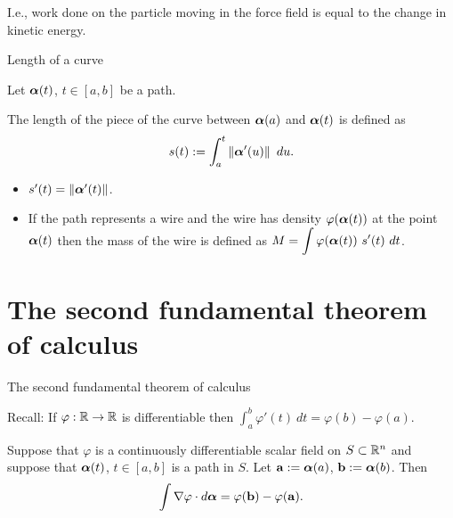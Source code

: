 {I.e.,}
work done on the particle moving in the force field is equal to the change in kinetic energy.





    {Length of a curve}

Let \(\boldsymbol{\alpha}(t)\), \(t\in [a,b]\) be a path.
\begin{definition}
    The length of the piece of the curve between \(\boldsymbol{\alpha}(a)\) and \(\boldsymbol{\alpha}(t)\) is defined as
    \[
        s(t) := \int_a^t \norm{\aalpha'(u)} \ du.
    \]
\end{definition}

\begin{itemize}
    \item  \(s'(t) = \left\|\boldsymbol{\alpha}'(t)\right\| \).
    \item If the path represents a wire and the wire has density \(\varphi(\boldsymbol{\alpha}(t))\) at the point \(\boldsymbol{\alpha}(t)\) then the mass of the wire is defined as
          \(M = \displaystyle\int \varphi(\boldsymbol{\alpha}(t)) \ s'(t) \ dt\).
\end{itemize}







\section{The second fundamental theorem of calculus}



 {The second fundamental theorem of calculus}


 {Recall:}
If \(\varphi:\mathbb{R} \to \mathbb{R}\) is differentiable then
\(\int_a^b \varphi'(t) \ dt = \varphi(b) - \varphi(a)\).

\begin{theorem}
    Suppose that \(\varphi\) is a continuously differentiable scalar field on \(S \subset \mathbb{R}^n\)
    and suppose that \(\boldsymbol{\alpha}(t)\), \(t\in[a,b]\) is a path in \(S\).
    Let \(\mathbf{a}:= \boldsymbol{\alpha}(a)\),  \(\mathbf{b}:= \boldsymbol{\alpha}(b)\).
    Then
    \[
        \int \nabla \varphi \cdot d\boldsymbol{\alpha} = \varphi(\mathbf{b}) - \varphi(\mathbf{a}).
    \]
\end{theorem}

